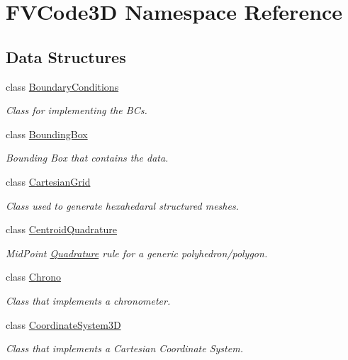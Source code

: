 \hypertarget{namespaceFVCode3D}{}\section{F\+V\+Code3D Namespace Reference}
\label{namespaceFVCode3D}
\subsection*{Data Structures}
\begin{DoxyCompactItemize}
\item 
class \hyperlink{classFVCode3D_1_1BoundaryConditions}{Boundary\+Conditions}
\begin{DoxyCompactList}\small\item\em Class for implementing the B\+Cs. \end{DoxyCompactList}\item 
class \hyperlink{classFVCode3D_1_1BoundingBox}{Bounding\+Box}
\begin{DoxyCompactList}\small\item\em Bounding Box that contains the data. \end{DoxyCompactList}\item 
class \hyperlink{classFVCode3D_1_1CartesianGrid}{Cartesian\+Grid}
\begin{DoxyCompactList}\small\item\em Class used to generate hexahedaral structured meshes. \end{DoxyCompactList}\item 
class \hyperlink{classFVCode3D_1_1CentroidQuadrature}{Centroid\+Quadrature}
\begin{DoxyCompactList}\small\item\em Mid\+Point \hyperlink{classFVCode3D_1_1Quadrature}{Quadrature} rule for a generic polyhedron/polygon. \end{DoxyCompactList}\item 
class \hyperlink{classFVCode3D_1_1Chrono}{Chrono}
\begin{DoxyCompactList}\small\item\em Class that implements a chronometer. \end{DoxyCompactList}\item 
class \hyperlink{classFVCode3D_1_1CoordinateSystem3D}{Coordinate\+System3D}
\begin{DoxyCompactList}\small\item\em Class that implements a Cartesian Coordinate System. \end{DoxyCompactList}\item 

\end{DoxyCompactItemize}
